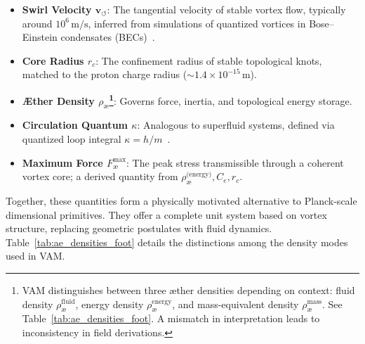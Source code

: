 \documentclass[12pt]{article}
\begin{document}
\begin{itemize}
    \item \textbf{Swirl Velocity \( \mathbf{v}_{\scriptscriptstyle\boldsymbol{\circlearrowleft}} \)}: The tangential velocity of stable vortex flow, typically around \( 10^6 \, \text{m/s} \), inferred from simulations of quantized vortices in Bose–Einstein condensates (BECs)~\cite{Pethick2008BEC, Kleckner2013KnottedVortices}.

    \item \textbf{Core Radius \( r_c \)}: The confinement radius of stable topological knots, matched to the proton charge radius (\( \sim 1.4 \times 10^{-15} \, \text{m} \)).

    \item \textbf{Æther Density \( \rho_\text{\ae} \)\footnote{VAM distinguishes between three æther densities depending on context: fluid density \( \rho_\text{\ae}^{\text{fluid}} \), energy density \( \rho_\text{\ae}^{\text{energy}} \), and mass-equivalent density \( \rho_\text{\ae}^{\text{mass}} \). See Table~\ref{tab:ae_densities_foot}. A mismatch in interpretation leads to inconsistency in field derivations.}}: Governs force, inertia, and topological energy storage.

    \item \textbf{Circulation Quantum \( \kappa \)}: Analogous to superfluid systems, defined via quantized loop integral \( \kappa = h / m \)~\cite{Donnelly1991QuantizedVortices}.

    \item \textbf{Maximum Force \( F^{\text{max}}_{\text{\ae}} \)}: The peak stress transmissible through a coherent vortex core; a derived quantity from \( \rho_\text{\ae}^{\text{(energy)}}, C_e, r_c \).
\end{itemize}

\vspace{0.5em}

Together, these quantities form a physically motivated alternative to Planck-scale dimensional primitives. They offer a complete unit system based on vortex structure, replacing geometric postulates with fluid dynamics. Table~\ref{tab:ae_densities_foot} details the distinctions among the density modes used in VAM.
\end{document}
